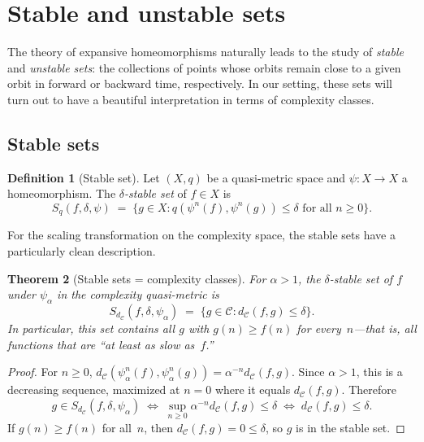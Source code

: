 \documentclass[11pt,a4paper]{article}
\theoremstyle{plain}
\newtheorem{theoreminner}{Theorem}[section]
\theoremstyle{definition}
\newtheorem{definitioninner}[theoreminner]{Definition}
\newenvironment{theorem}[1][]{\begin{theoreminner}[#1]}{\end{theoreminner}}
\newenvironment{definition}[1][]{\begin{definitioninner}[#1]}{\end{definitioninner}}
\newcommand{\C}{\mathcal{C}}
\begin{document}
\section{Stable and unstable sets}
\label{sec:stable-unstable}

The theory of expansive homeomorphisms naturally leads to the study
of \emph{stable} and \emph{unstable sets}: the collections of
points whose orbits remain close to a given orbit in forward or
backward time, respectively.  In our setting, these sets will turn
out to have a beautiful interpretation in terms of complexity classes.

\subsection{Stable sets}

\begin{definition}[Stable set]\label{def:stable}
Let $(X,q)$ be a quasi-metric space and $\psi\colon X\to X$ a
homeomorphism.  The \emph{$\delta$-stable set} of $f\in X$ is
\[
  S_q(f,\delta,\psi)
  \;=\; \{g\in X : q(\psi^n(f),\psi^n(g))\le\delta
    \text{ for all }n\ge 0\}.
\]
\end{definition}

For the scaling transformation on the complexity space, the stable
sets have a particularly clean description.

\begin{theorem}[Stable sets = complexity classes]\label{thm:stable-sets}
For $\alpha>1$, the $\delta$-stable set of $f$ under $\psi_\alpha$
in the complexity quasi-metric is
\[
  S_{d_\C}(f,\delta,\psi_\alpha)
  \;=\; \{g\in\C : d_\C(f,g)\le\delta\}.
\]
In particular, this set contains all $g$ with $g(n)\ge f(n)$ for
every~$n$---that is, all functions that are ``at least as slow
as~$f$.''
\end{theorem}

\begin{proof}
For $n\ge 0$, $d_\C(\psi_\alpha^n(f),\psi_\alpha^n(g))
=\alpha^{-n}d_\C(f,g)$.  Since $\alpha>1$, this is a decreasing
sequence, maximized at $n=0$ where it equals $d_\C(f,g)$.
Therefore
\[
  g\in S_{d_\C}(f,\delta,\psi_\alpha)
  \;\Longleftrightarrow\;
  \sup_{n\ge 0}\alpha^{-n}d_\C(f,g)\le\delta
  \;\Longleftrightarrow\;
  d_\C(f,g)\le\delta.
\]
If $g(n)\ge f(n)$ for all~$n$, then $d_\C(f,g)=0\le\delta$, so
$g$ is in the stable set.
\end{proof}
\end{document}
